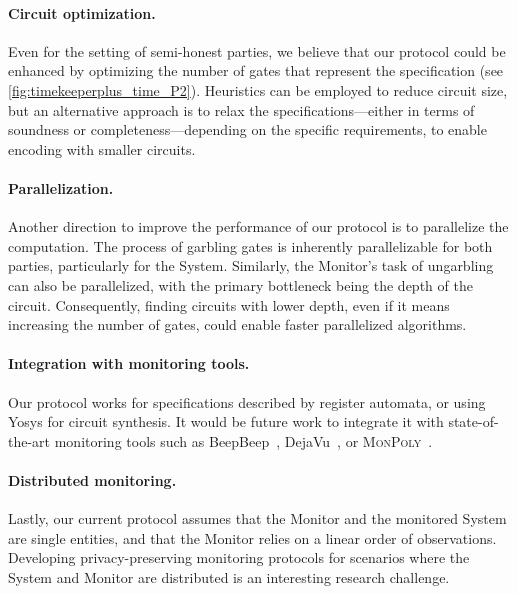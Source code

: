 \paragraph{Circuit optimization.}
Even for the setting of semi-honest parties, we believe that our protocol could be enhanced by optimizing the number of gates that represent the specification (see \cref{fig:timekeeperplus_time_P2}).
Heuristics can be employed to reduce circuit size, but an alternative approach is to relax the specifications---either in terms of soundness or completeness---depending on the specific requirements, to enable encoding with smaller circuits.

\paragraph{Parallelization.}
Another direction to improve the performance of our protocol is to parallelize the computation. The process of garbling gates is inherently parallelizable for both parties, particularly for the System. Similarly, the Monitor's task of ungarbling can also be parallelized, with the primary bottleneck being the depth of the circuit. Consequently, finding circuits with lower depth, even if it means increasing the number of gates, could enable faster parallelized algorithms.

\paragraph{Integration with monitoring tools.}
Our protocol works for specifications described by register automata, or using Yosys for circuit synthesis. It would be future work to integrate it with state-of-the-art monitoring tools such as BeepBeep~\cite{MKH18}, DejaVu~\cite{HPU18}, or \textsc{MonPoly}~\cite{BKZ17}.

\paragraph{Distributed monitoring.}
Lastly, our current protocol assumes that the Monitor and the monitored System are single entities, and that the Monitor relies on a linear order of observations.
Developing privacy-preserving monitoring protocols for scenarios where the System and Monitor are distributed is an interesting research challenge.
